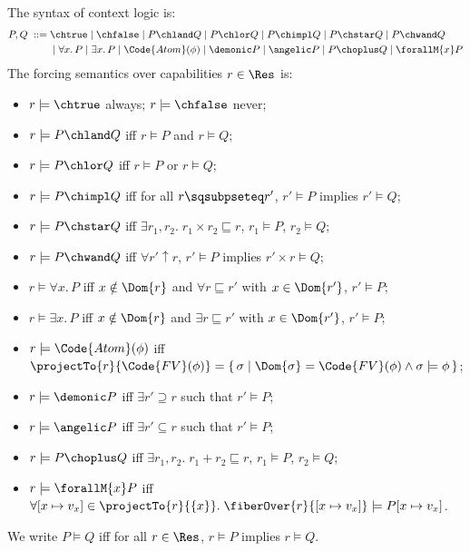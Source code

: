 \begin{definition}\label{def:context-logic}
  The syntax of context logic is:
  \begin{align*}
    P, Q \;::=\; &\chtrue \mid \chfalse \mid P \chland Q \mid P \chlor Q \mid P \chimpl Q \mid P \chstar Q \mid P \chwand Q
    \\& \mid \forall x.\, P \mid \exists x.\, P \mid \Code{Atom}(\phi)
    \mid \demonic P \mid \angelic P \mid P \choplus Q \mid \forallM{x} P
  \end{align*}
  The forcing semantics over capabilities $r \in \Res$ is:
  \begin{itemize}
  \item $r \models \chtrue$ always; \quad $r \models \chfalse$ never;
  \item $r \models P \chland Q$ iff $r \models P$ and $r \models Q$;
  \item $r \models P \chlor Q$ iff $r \models P$ or $r \models Q$;
  \item $r \models P \chimpl Q$ iff for all $r \sqsubpseteq r'$, $r' \models P$ implies $r' \models Q$;
  \item $r \models P \chstar Q$ iff $\exists r_1, r_2.\; r_1 \times r_2 \sqsubseteq r$,\; $r_1 \models P$,\; $r_2 \models Q$;
  \item $r \models P \chwand Q$ iff $\forall r' \uparrow r$,\; $r' \models P$ implies $r' \times r \models Q$;
  \item $r \models \forall x.\, P$ iff $x \notin \Dom{r}$ and $\forall r \sqsubseteq r'$ with $x \in \Dom{r'}$,\; $r' \models P$;
  \item $r \models \exists x.\, P$ iff $x \notin \Dom{r}$ and $\exists r \sqsubseteq r'$ with $x \in \Dom{r'}$,\; $r' \models P$;
  \item $r \models \Code{Atom}(\phi)$ iff $\projectTo{r}{\Code{FV}(\phi)} = \{\,\sigma \mid \Dom{\sigma} = \Code{FV}(\phi) \land \sigma \models \phi\,\}$;
  \item $r \models \demonic P$ iff $\exists r' \supseteq r$ such that $r' \models P$;
  \item $r \models \angelic P$ iff $\exists r' \subseteq r$ such that $r' \models P$;
  \item $r \models P \choplus Q$ iff $\exists r_1, r_2.\; r_1 + r_2 \sqsubseteq r$,\; $r_1 \models P$,\; $r_2 \models Q$;
  \item $r \models \forallM{x} P$ iff $\forall [x \mapsto v_x] \in \projectTo{r}{\{x\}}.\; \fiberOver{r}{[x \mapsto v_x]} \models P[x \mapsto v_x]$.
  \end{itemize}
  We write $P \models Q$ iff for all $r \in \Res$, $r \models P$ implies $r \models Q$.
\end{definition}

